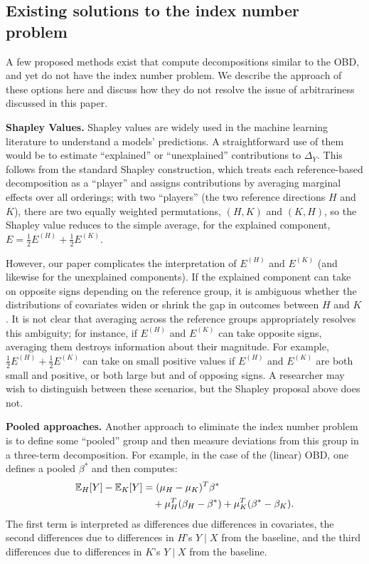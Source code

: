 \subsection{Existing solutions to the index number problem}
\label{sec:existing_index_number}
A few proposed methods exist that compute decompositions similar to the OBD, and yet do not have the index number problem.
We describe the approach of these options here and discuss how they do not resolve the issue of arbitrariness discussed in this paper.

\textbf{Shapley Values.} Shapley values \citep{Shapley1953} are widely used in the machine learning literature to understand a models' predictions.
A straightforward use of them would be to estimate ``explained'' or ``unexplained'' contributions to $\Delta_Y$.
This follows from the standard Shapley construction, which treats each reference-based decomposition as a ``player'' and assigns contributions by averaging marginal effects over all orderings; with two ``players'' (the two reference directions $H$ and $K$), there are two equally weighted permutations, $(H,K)$ and $(K,H)$, so the Shapley value reduces to the simple average, for the explained component, $E = \tfrac{1}{2}E^{(H)} + \tfrac{1}{2}E^{(K)}$.

However, our paper complicates the interpretation of $E^{(H)}$ and $E^{(K)}$ (and likewise for the unexplained components). 
If the explained component can take on opposite signs depending on the reference group, it is ambiguous whether the distributions of covariates widen or shrink the gap in outcomes between $H$ and $K$.
It is not clear that averaging across the reference groups appropriately resolves this ambiguity; for instance, if $E^{(H)}$ and $E^{(K)}$ can take opposite signs, averaging them destroys information about their magnitude.
For example, $\tfrac{1}{2}E^{(H)} + \tfrac{1}{2}E^{(K)}$ can take on small positive values if $E^{(H)}$ and $E^{(K)}$ are both small and positive, or both large but and of opposing signs. 
A researcher may wish to distinguish between these scenarios, but the Shapley proposal above does not.

\textbf{Pooled approaches.}
Another approach to eliminate the index number problem is to define some ``pooled'' group and then measure deviations from this group in a three-term decomposition. For example, in the case of the (linear) OBD, one defines a pooled $\beta^*$ and then computes:
{\color{red}
\begin{align}
  \mathbb{E}_H[Y] - \mathbb{E}_K[Y] &= (\mu_H - \mu_K)^T \beta^* \nonumber \\
  &\quad + \mu_H^T (\beta_H - \beta^*) + \mu_K^T(\beta^* - \beta_K).
\end{align}}
The first term is interpreted as differences due differences in covariates, the second differences due to differences in $H$'s $Y \mid X$ from the baseline, and the third differences due to differences in $K$'s $Y \mid X$ from the baseline.

